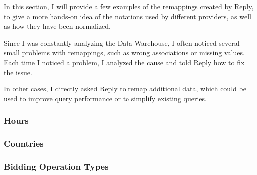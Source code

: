 In this section, I will provide a few examples of the remappings created by Reply, to give a more hands-on idea of the notations used by different providers, as well as how they have been normalized.
    
Since I was constantly analyzing the Data Warehouse, I often noticed several small problems with remappings, such as wrong associations or missing values.
Each time I noticed a problem, I analyzed the cause and told Reply how to fix the issue.

In other cases, I directly asked Reply to remap additional data, which could be used to improve query performance or to simplify existing queries.

\subsubsection{Hours}
    
    
\subsubsection{Countries}
    
    
\subsubsection{Bidding Operation Types}
    

%     